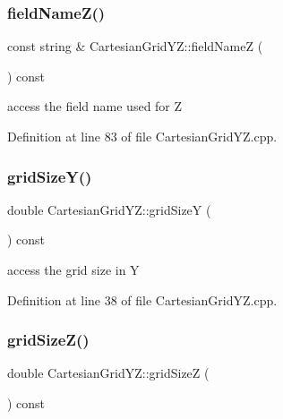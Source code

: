 \subsubsection{\texorpdfstring{field\+Name\+Z()}{fieldNameZ()}}
{\footnotesize\ttfamily const string \& Cartesian\+Grid\+Y\+Z\+::field\+NameZ (\begin{DoxyParamCaption}{ }\end{DoxyParamCaption}) const}



access the field name used for Z 



Definition at line 83 of file Cartesian\+Grid\+Y\+Z.\+cpp.

\hypertarget{class_d_d4hep_1_1_geometry_1_1_cartesian_grid_y_z_a10357a2a916abbc6fc41c23a50d98e78}{}\label{class_d_d4hep_1_1_geometry_1_1_cartesian_grid_y_z_a10357a2a916abbc6fc41c23a50d98e78} 
\subsubsection{\texorpdfstring{grid\+Size\+Y()}{gridSizeY()}}
{\footnotesize\ttfamily double Cartesian\+Grid\+Y\+Z\+::grid\+SizeY (\begin{DoxyParamCaption}{ }\end{DoxyParamCaption}) const}



access the grid size in Y 



Definition at line 38 of file Cartesian\+Grid\+Y\+Z.\+cpp.

\hypertarget{class_d_d4hep_1_1_geometry_1_1_cartesian_grid_y_z_a44c11c7e8c4a96a718819b2727312912}{}\label{class_d_d4hep_1_1_geometry_1_1_cartesian_grid_y_z_a44c11c7e8c4a96a718819b2727312912} 
\subsubsection{\texorpdfstring{grid\+Size\+Z()}{gridSizeZ()}}
{\footnotesize\ttfamily double Cartesian\+Grid\+Y\+Z\+::grid\+SizeZ (\begin{DoxyParamCaption}{ }\end{DoxyParamCaption}) const}



